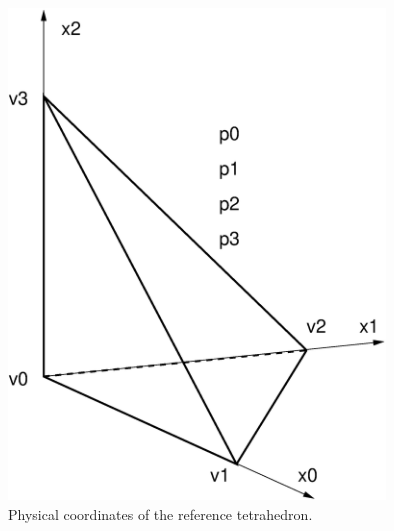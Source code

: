 \begin{figure}[htbp]
  \begin{center}
    \includegraphics[width=10cm]{eps/reference_tetrahedron.eps}
    \caption{Physical coordinates of the reference tetrahedron.}
    \label{fig:reference_tetrahedron}
  \end{center}
\end{figure}

